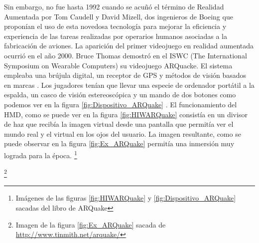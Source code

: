 Sin embargo, no fue hasta 1992 cuando se acuñó el término de Realidad Aumentada por Tom Caudell y David Mizell, dos ingenieros de Boeing que proponían el uso de esta novedosa tecnología para mejorar la eficiencia y experiencia de las tareas realizadas por operarios humanos asociadas a la fabricación de aviones.
La aparición del primer videojuego en realidad aumentada ocurrió en el año 2000. Bruce Thomas demostró en el ISWC (The International Symposium on Wearable Computers) su videojuego ARQuacke. El sistema empleaba una brújula digital, un receptor de GPS y métodos de visión basados en marcas \cite{ARToolkit}. Los jugadores tenían que llevar una especie de ordenador portátil a la espalda, un casco de visión estereoscópica y un mando de dos botones\cite{ARQuake} como podemos ver en la figura \ref{fig:Dispositivo_ARQuake} . El funcionamiento del HMD, como se puede ver en la figura \ref{fig:HIWARQuake} consistía en un divisor de haz que recibía la imagen virtual desde una pantalla que permitía ver el mundo real y el virtual en los ojos del usuario. La imagen resultante, como se puede observar en la figura \ref{fig:Ex_ARQuake} permitía una inmersión muy lograda para la época.
{\let\thefootnote\relax\footnote{{{Imágenes de las figuras \ref{fig:HIWARQuake} y \ref{fig:Dispositivo_ARQuake} sacadas del libro de ARQuake\cite{ARQuake}  }}}}

{\let\thefootnote\relax\footnote{{Imagen de la figura \ref{fig:Ex_ARQuake} sacada de \url{http://www.tinmith.net/arquake/}}}}


